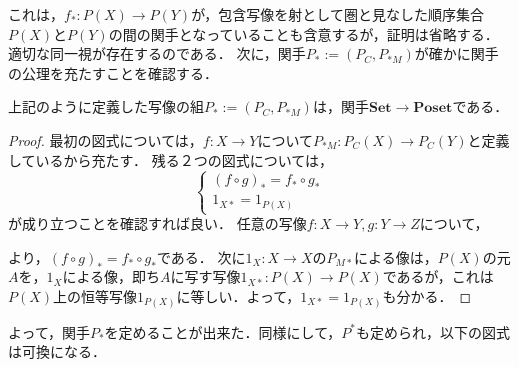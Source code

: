 \documentclass[uplatex, dvipdfmx]{jsreport}
\begin{document}
これは，$f_*:P(X)\to P(Y)$が，包含写像を射として圏と見なした順序集合$P(X)$と$P(Y)$の間の関手となっていることも含意するが，証明は省略する．適切な同一視が存在するのである．
次に，関手$P_*:=(P_C,P_{*M})$が確かに関手の公理を充たすことを確認する．
\begin{proposition}[共変冪集合関手$P_*$]
    上記のように定義した写像の組$P_*:=(P_C,P_{*M})$は，関手$\mathbf{Set}\to\mathbf{Poset}$である．
\end{proposition}
\begin{proof}
    最初の図式については，$f:X\to Y$について$P_{*M}:P_C(X)\to P_C(Y)$と定義しているから充たす．
    残る２つの図式については，
    $$\left\{ \begin{array}{c}
        (f\circ g)_* = f_*\circ g_* \\
        1_{X*} = 1_{P(X)}
    \end{array} \right.$$が成り立つことを確認すれば良い．
    任意の写像$f:X\to Y, g:Y\to Z$について，
    \begin{center}\end{center}
    より，$(f\circ g)_* = f_*\circ g_*$である．
    次に$1_X:X\to X$の$P_{M*}$による像は，$P(X)$の元$A$を，$1_X$による像，即ち$A$に写す写像$1_{X*}:P(X)\to P(X)$であるが，これは$P(X)$上の恒等写像$1_{P(X)}$に等しい．よって，$1_{X*} = 1_{P(X)}$も分かる．
\end{proof}

よって，関手$P_*$を定めることが出来た．同様にして，$P^*$も定められ，以下の図式は可換になる．
\begin{center}\end{center}
\end{document}
